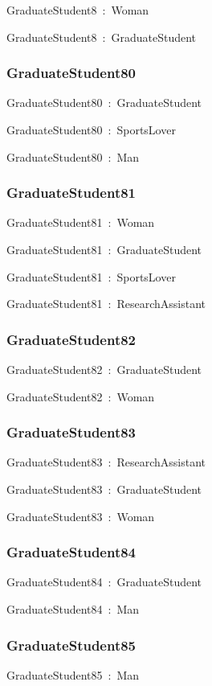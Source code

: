\documentclass{article}
\begin{document}
GraduateStudent8~:~Woman

GraduateStudent8~:~GraduateStudent

\subsubsection*{GraduateStudent80}

GraduateStudent80~:~GraduateStudent

GraduateStudent80~:~SportsLover

GraduateStudent80~:~Man

\subsubsection*{GraduateStudent81}

GraduateStudent81~:~Woman

GraduateStudent81~:~GraduateStudent

GraduateStudent81~:~SportsLover

GraduateStudent81~:~ResearchAssistant

\subsubsection*{GraduateStudent82}

GraduateStudent82~:~GraduateStudent

GraduateStudent82~:~Woman

\subsubsection*{GraduateStudent83}

GraduateStudent83~:~ResearchAssistant

GraduateStudent83~:~GraduateStudent

GraduateStudent83~:~Woman

\subsubsection*{GraduateStudent84}

GraduateStudent84~:~GraduateStudent

GraduateStudent84~:~Man

\subsubsection*{GraduateStudent85}

GraduateStudent85~:~Man
\end{document}
